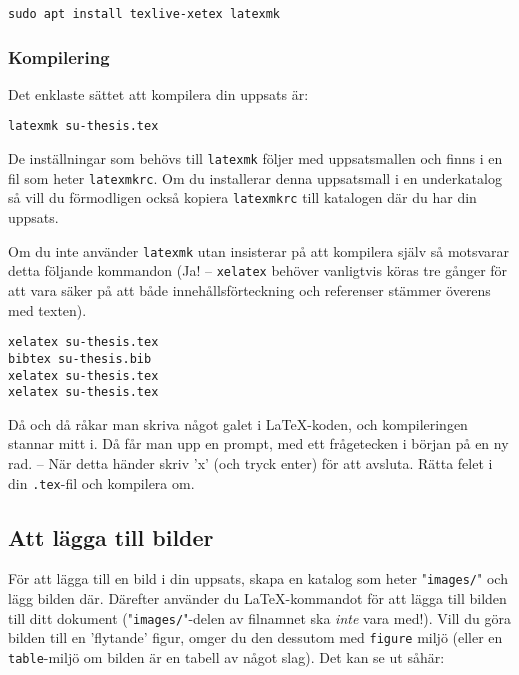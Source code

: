 \begin{verbatim}
sudo apt install texlive-xetex latexmk
\end{verbatim}



\subsubsection{Kompilering}

Det enklaste sättet att kompilera din uppsats är:

\begin{verbatim}
latexmk su-thesis.tex
\end{verbatim}

De inställningar som behövs till \texttt{latexmk} följer med uppsatsmallen och
finns i en fil som heter \texttt{latexmkrc}. Om du installerar denna
uppsatsmall i en underkatalog så vill du förmodligen också kopiera
\texttt{latexmkrc} till katalogen där du har din uppsats.

Om du inte använder \texttt{latexmk} utan insisterar på att kompilera
själv så motsvarar detta följande kommandon (Ja! -- \texttt{xelatex} behöver
vanligtvis köras tre gånger för att vara säker på att både innehållsförteckning
och referenser stämmer överens med texten).

\begin{verbatim}
xelatex su-thesis.tex
bibtex su-thesis.bib
xelatex su-thesis.tex
xelatex su-thesis.tex
\end{verbatim}

\noindent Då och då råkar man skriva något galet i \LaTeX-koden, och kompileringen
stannar mitt i. Då får man upp en prompt, med ett frågetecken i början på en ny
rad. -- När detta händer skriv 'x' (och tryck enter) för att avsluta. Rätta
felet i din \texttt{.tex}-fil och kompilera om.


\subsection{Att lägga till bilder}
\label{bilder}

För att lägga till en bild i din uppsats, skapa en katalog som heter
"\texttt{images/}" och lägg bilden där. Därefter använder du \LaTeX-kommandot
 för att lägga till bilden till ditt dokument
("\texttt{images/}"-delen av filnamnet ska \emph{inte} vara med!). Vill du göra
bilden till en 'flytande' figur, omger du den dessutom med \texttt{figure}
miljö (eller en \texttt{table}-miljö om bilden är en tabell av något slag). Det
kan se ut såhär:

